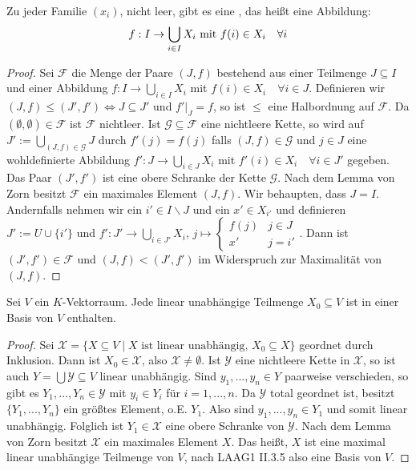 \begin{conclusion}[Auswahlaxiom]
	Zu jeder Familie $(x_i)$, nicht leer, gibt es eine , das heißt eine Abbildung:
	\begin{align}
		f: I\to \bigcup_{i\in I} X_i\text{ mit } f(i)\in X_i\quad\forall i\notag
	\end{align}
\end{conclusion}
\begin{proof}
	Sei $\mathcal{F}$ die Menge der Paare $(J,f)$ bestehend aus einer Teilmenge $J\subseteq I$ und einer Abbildung $f:I\to \bigcup_{i\in I} X_i$ mit $f(i)\in X_i\quad\forall i\in J$. Definieren wir $(J,f)\le (J',f')\iff J\subseteq J'$ und $f'\vert_J = f$, so ist $\le$ eine Halbordnung auf $\mathcal{F}$. Da $(\emptyset,\emptyset)\in\mathcal{F}$ ist $\mathcal{F}$ nichtleer. Ist $\mathcal{G}\subseteq\mathcal{F}$ eine nichtleere Kette, so wird auf $J':=\bigcup_{(J,f)\in\mathcal{G}} J$ durch $f'(j)=f(j)$ falls $(J,f)\in\mathcal{G}$ und $j\in J$ eine wohldefinierte Abbildung $f':J\to \bigcup_{i\in J}X_i$ mit $f'(i)\in X_i\quad\forall i\in J'$ gegeben. Das Paar $(J',f')$ ist eine obere Schranke der Kette $\mathcal{G}$. Nach dem Lemma von Zorn besitzt $\mathcal{F}$ ein maximales Element $(J,f)$. Wir behaupten, dass $J=I$. Andernfalls nehmen wir ein $i'\in I\backslash J$ und ein $x'\in X_{i'}$ und definieren $J':= U\cup\{i'\}$ und $f':J'\to \bigcup_{i\in J'} X_i$, $j\mapsto\begin{cases}f(j)&j\in J\\ x'&j=i'\end{cases}$. Dann ist $(J',f')\in\mathcal{F}$ und $(J,f)<(J',f')$ im Widerspruch zur Maximalität von $(J,f)$.
\end{proof}


\begin{conclusion}[Basisergänzungssatz]
	Sei $V$ ein $K$-Vektorraum. Jede linear unabhängige Teilmenge $X_0\subseteq V$ ist in einer Basis von $V$ enthalten.
\end{conclusion}
\begin{proof}
	Sei $\mathcal{X}=\{X\subseteq V\mid X\text{ ist linear unabhängig, } X_0\subseteq X\}$ geordnet durch Inklusion. Dann ist $X_0\in\mathcal{X}$, also $\mathcal{X}\neq\emptyset$. Ist $\mathcal{Y}$ eine nichtleere Kette in $\mathcal{X}$, so ist auch $Y=\bigcup\mathcal{Y}\subseteq V$ linear unabhängig. Sind $y_1,...,y_n\in Y$ paarweise verschieden, so gibt es $Y_1,...,Y_n\in\mathcal{Y}$ mit $y_i\in Y_i$ für $i=1,...,n$. Da $\mathcal{Y}$ total geordnet ist, besitzt $\{Y_1,...,Y_n\}$ ein größtes Element, o.E. $Y_1$. Also sind $y_1,...,y_n\in Y_1$ und somit linear unabhängig. Folglich ist $Y_1\in \mathcal{X}$ eine obere Schranke von $\mathcal{Y}$. Nach dem Lemma von Zorn besitzt $\mathcal{X}$ ein maximales Element $X$. Das heißt, $X$ ist eine maximal linear unabhängige Teilmenge von $V$, nach LAAG1 II.3.5 also eine Basis von $V$. %
	\end{proof}